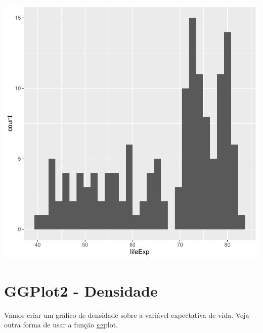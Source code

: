 \documentclass[
]{article}
\newenvironment{Shaded}{\begin{snugshade}}{\end{snugshade}}
\newcommand{\DataTypeTok}[1]{\textcolor[rgb]{0.13,0.29,0.53}{#1}}
\newcommand{\KeywordTok}[1]{\textcolor[rgb]{0.13,0.29,0.53}{\textbf{#1}}}
\newcommand{\NormalTok}[1]{#1}
\newcommand{\OperatorTok}[1]{\textcolor[rgb]{0.81,0.36,0.00}{\textbf{#1}}}
\newcommand{\StringTok}[1]{\textcolor[rgb]{0.31,0.60,0.02}{#1}}
\begin{document}
\begin{center}\includegraphics{arquivo_pdf_files/figure-latex/histograma2-1} \end{center}

\hypertarget{ggplot2---densidade}{%
\section{GGPlot2 - Densidade}\label{ggplot2---densidade}}

Vamos criar um gráfico de densidade sobre a variável expectativa de
vida. Veja outra forma de usar a função ggplot.

\begin{Shaded}
\end{Shaded}
\end{document}
